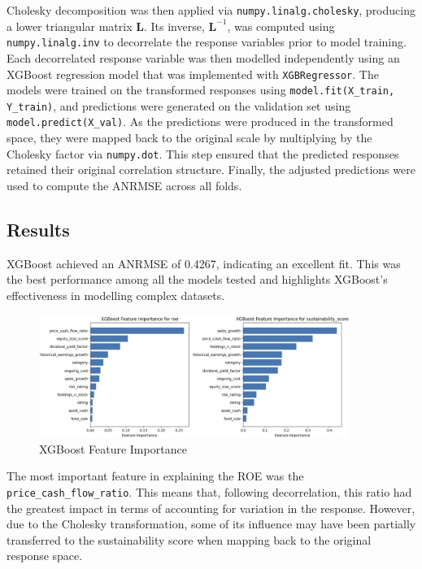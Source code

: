 \documentclass[11pt]{report} %
\begin{document}
Cholesky decomposition was then applied via \texttt{numpy.linalg.cholesky}, producing a lower triangular matrix \( \mathbf{L} \). Its inverse, \( \mathbf{L}^{-1} \), was computed using \texttt{numpy.linalg.inv} to decorrelate the response variables prior to model training.
Each decorrelated response variable was then modelled independently using an XGBoost regression model that was implemented with \texttt{XGBRegressor}.
The models were trained on the transformed responses using \texttt{model.fit(X\_train, Y\_train)}, and predictions were generated on the validation set using \texttt{model.predict(X\_val)}.
As the predictions were produced in the transformed space, they were mapped back to the original scale by multiplying by the Cholesky factor via \texttt{numpy.dot}. This step ensured that the predicted responses retained their original correlation structure. Finally, the adjusted predictions were used to compute the ANRMSE across all folds.



\subsection{Results}
XGBoost achieved an ANRMSE of 0.4267, indicating an excellent fit. This was the best performance among all the models tested and highlights XGBoost’s effectiveness in modelling complex datasets.
\begin{figure}[H]
    \centering
    \includegraphics[width=0.9\textwidth]{Plots/XGBoost Feature Importance.png}
    \caption{XGBoost Feature Importance}
    \label{fig:xgboostFI}
\end{figure}
\noindent The most important feature in explaining the ROE was the \texttt{price\_cash\_flow\_ratio}. This means that, following decorrelation, this ratio had the greatest impact in terms of accounting for variation in the response. However, due to the Cholesky transformation, some of its influence may have been partially transferred to the sustainability score when mapping back to the original response space.
\end{document}
